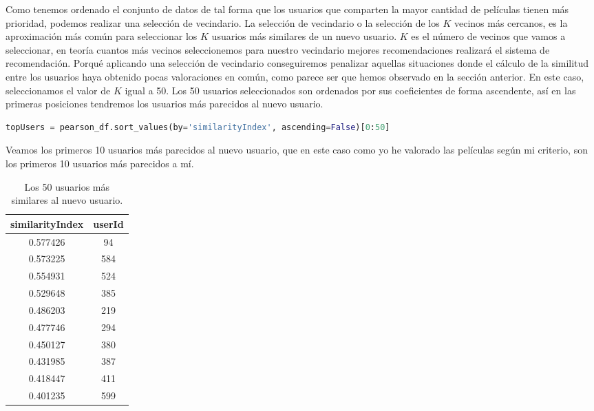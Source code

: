 \documentclass{uimppracticas}
\begin{document}
Como tenemos ordenado el conjunto de datos de tal forma que los usuarios que comparten la mayor cantidad de películas tienen más prioridad, podemos realizar una selección de vecindario. La selección de vecindario o la selección de los $K$ vecinos más cercanos, es la aproximación más común para seleccionar los $K$ usuarios más similares de un nuevo usuario. $K$ es el número de vecinos que vamos a seleccionar, en teoría cuantos más vecinos seleccionemos para nuestro vecindario mejores recomendaciones realizará el sistema de recomendación. Porqué aplicando una selección de vecindario conseguiremos penalizar aquellas situaciones donde el cálculo de la similitud entre los usuarios haya obtenido pocas valoraciones en común, como parece ser que hemos observado en la sección anterior. En este caso, seleccionamos el valor de $K$ igual a 50. Los 50 usuarios seleccionados son ordenados por sus coeficientes de forma ascendente, así en las primeras posiciones tendremos los usuarios más parecidos al nuevo usuario.

\begin{lstlisting}[language=python, basicstyle=\small]
topUsers = pearson_df.sort_values(by='similarityIndex', ascending=False)[0:50]
\end{lstlisting}

Veamos los primeros 10 usuarios más parecidos al nuevo usuario, que en este caso como yo he valorado las películas según mi criterio, son los primeros 10 usuarios más parecidos a mí.

\begin{table}[h]
	\centering
	\begin{tabular}{cc}
		\toprule
		similarityIndex &  userId \\
		\midrule
		0.577426 &      94 \\
		0.573225 &     584 \\
		0.554931 &     524 \\
		0.529648 &     385 \\
		0.486203 &     219 \\
		0.477746 &     294 \\
		0.450127 &     380 \\
		0.431985 &     387 \\
		0.418447 &     411 \\
		0.401235 &     599 \\
		\bottomrule
	\end{tabular}
	\caption{Los 50 usuarios más similares al nuevo usuario.}
	\label{top_50}
\end{table}
\end{document}
